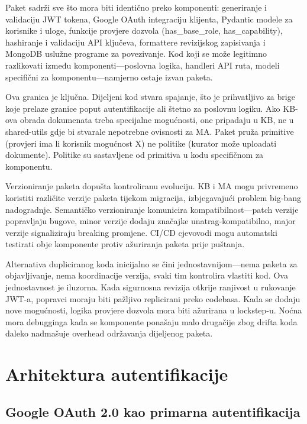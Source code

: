 \documentclass[12pt,a4paper]{article}
\begin{document}
Paket sadrži sve što mora biti identično preko komponenti: generiranje i validaciju JWT tokena, Google OAuth integraciju klijenta, Pydantic modele za korisnike i uloge, funkcije provjere dozvola (has\_base\_role, has\_capability), hashiranje i validaciju API ključeva, formattere revizijskog zapisivanja i MongoDB uslužne programe za povezivanje. Kod koji se može legitimno razlikovati između komponenti—poslovna logika, handleri API ruta, modeli specifični za komponentu—namjerno ostaje izvan paketa.

Ova granica je ključna. Dijeljeni kod stvara spajanje, što je prihvatljivo za brige koje prelaze granice poput autentifikacije ali štetno za poslovnu logiku. Ako KB-ova obrada dokumenata treba specijalne mogućnosti, one pripadaju u KB, ne u shared-utils gdje bi stvarale nepotrebne ovisnosti za MA. Paket pruža primitive (provjeri ima li korisnik mogućnost X) ne politike (kurator može uploadati dokumente). Politike su sastavljene od primitiva u kodu specifičnom za komponentu.

Verzioniranje paketa dopušta kontroliranu evoluciju. KB i MA mogu privremeno koristiti različite verzije paketa tijekom migracija, izbjegavajući problem big-bang nadogradnje. Semantičko verzioniranje komunicira kompatibilnost—patch verzije popravljaju bugove, minor verzije dodaju značajke unatrag-kompatibilno, major verzije signaliziraju breaking promjene. CI/CD cjevovodi mogu automatski testirati obje komponente protiv ažuriranja paketa prije puštanja.

Alternativa dupliciranog koda inicijalno se čini jednostavnijom—nema paketa za objavljivanje, nema koordinacije verzija, svaki tim kontrolira vlastiti kod. Ova jednostavnost je iluzorna. Kada sigurnosna revizija otkrije ranjivost u rukovanje JWT-a, popravci moraju biti pažljivo replicirani preko codebasa. Kada se dodaju nove mogućnosti, logika provjere dozvola mora biti ažurirana u lockstep-u. Noćna mora debugginga kada se komponente ponašaju malo drugačije zbog drifta koda daleko nadmašuje overhead održavanja dijeljenog paketa.

\section{Arhitektura autentifikacije}

\subsection{Google OAuth 2.0 kao primarna autentifikacija}
\end{document}

